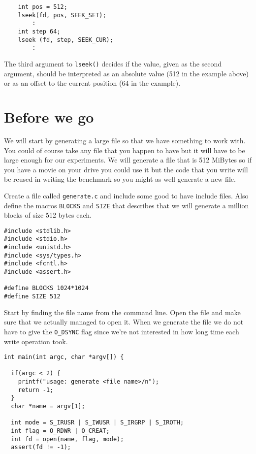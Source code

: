 \documentclass[a4paper,11pt]{article}
\begin{document}
\begin{lstlisting}
    int pos = 512;
    lseek(fd, pos, SEEK_SET);
        :
    int step 64;
    lseek (fd, step, SEEK_CUR);
        :
\end{lstlisting}

The third argument to {\tt lseek()} decides if the value, given as the
second argument, should be interpreted as an absolute value (512 in the
example above) or as an offset to the current position (64 in the
example).

\section{Before we go}

We will start by generating a large file so that we have something to
work with. You could of course take any file that you happen to have
but it will have to be large enough for our experiments. We will
generate a file that is 512 MiBytes so if you have a movie on your drive
you could use it but the code that you write will be reused in writing
the benchmark so you might as well generate a new file.

Create a file called {\tt generate.c} and include some good to have
include files. Also define the macros {\tt BLOCKS} and {\tt SIZE}
that describes that we will generate a million blocks of size 512
bytes each.

\begin{lstlisting}
#include <stdlib.h>
#include <stdio.h>
#include <unistd.h>
#include <sys/types.h>
#include <fcntl.h>
#include <assert.h>

#define BLOCKS 1024*1024
#define SIZE 512
\end{lstlisting}

Start by finding the file name from the command line. Open the file and
make sure that we actually managed to open it. When we generate the
file we do not have to give the {\tt O\_DSYNC} flag since we're not
interested in how long time each write operation took.

\begin{lstlisting}
int main(int argc, char *argv[]) {

  if(argc < 2) {
    printf("usage: generate <file name>/n");
    return -1;
  }
  char *name = argv[1];

  int mode = S_IRUSR | S_IWUSR | S_IRGRP | S_IROTH;
  int flag = O_RDWR | O_CREAT;
  int fd = open(name, flag, mode);
  assert(fd != -1);
\end{lstlisting}
\end{document}
